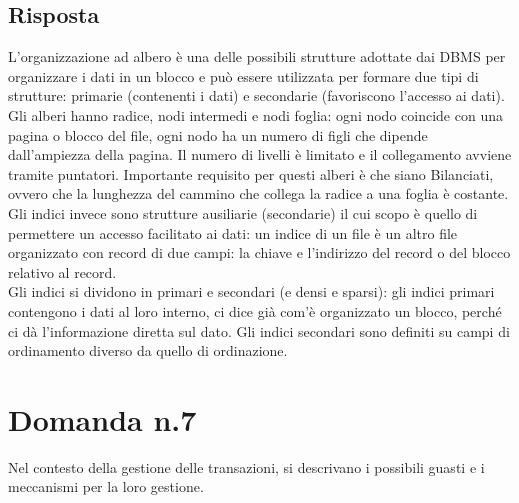 \documentclass{article}
\begin{document}
\subsection*{Risposta}
L'organizzazione ad albero è una delle possibili strutture adottate dai DBMS per organizzare i dati in un blocco e può essere utilizzata per formare due tipi di strutture: primarie (contenenti i dati) e secondarie (favoriscono l'accesso ai dati).\\
Gli alberi hanno radice, nodi intermedi e nodi foglia: ogni nodo coincide con una pagina o blocco del file, ogni nodo ha un numero di figli che dipende dall'ampiezza della pagina. Il numero di livelli è limitato e il collegamento avviene tramite puntatori. Importante requisito per questi alberi è che siano Bilanciati, ovvero che la lunghezza del cammino che collega la radice a una foglia è costante.\\
Gli indici invece sono strutture ausiliarie (secondarie) il cui scopo è quello di permettere un accesso facilitato ai dati: un indice di un file è un altro file organizzato con record di due campi: la chiave e l'indirizzo del record o del blocco relativo al record.\\ Gli indici si dividono in primari e secondari (e densi e sparsi): gli indici primari contengono i dati al loro interno, ci dice già com'è organizzato un blocco, perché ci dà l'informazione diretta sul dato. Gli indici secondari sono definiti su campi di ordinamento diverso da quello di ordinazione.

\section*{Domanda n.7}
Nel contesto della gestione delle transazioni, si descrivano i possibili guasti e i meccanismi per la loro gestione.
\end{document}
